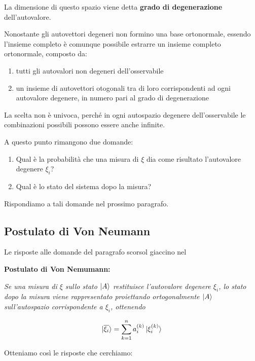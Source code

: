 La dimensione di questo spazio viene detta \textbf{grado di degenerazione} dell'autovalore.

Nonostante gli autovettori degeneri non formino una base ortonormale, essendo l'insieme completo è comunque possibile estrarre un insieme completo ortonormale, composto da:

\begin{enumerate}
	\item tutti gli autovalori non degeneri dell'osservabile
	\item un insieme di autovettori otogonali tra di loro corrispondenti ad ogni autovalore degenere, in numero pari al grado di degenerazione
\end{enumerate}

La scelta non è univoca, perché in ogni autospazio degenere dell'osservabile le combinazioni possibili possono essere anche infinite.

A questo punto rimangono due domande:

\begin{enumerate}
	\item Qual è la probabilità che una misura di $\xi$ dia come risultato l'autovalore degenere $\xi_i$?
	\item Qual è lo stato del sistema dopo la misura?
\end{enumerate}

Rispondiamo a tali domande nel prossimo paragrafo.
 
\subsection{Postulato di Von Neumann}
 
Le risposte alle domande del paragrafo scorsol giaccino nel 

\bigskip

\textbf{Postulato di Von Nemumann:} 

\textit{Se una misura di $\xi$ sullo stato $\ket{A}$ restituisce l'autovalore degenere $\xi_i$, lo stato dopo la misura viene rappresentato proiettando ortogonalmente $\ket{A}$ sull'autospazio corrispondente a $\xi_i$, ottenendo}

\begin{align}
\ket{\overline{\xi_i}}= \sum_{k=1}^n a_i^{(k)}\ket{\xi^{(k)}_i}
\end{align} 

\bigskip

Otteniamo così le risposte che cerchiamo:

